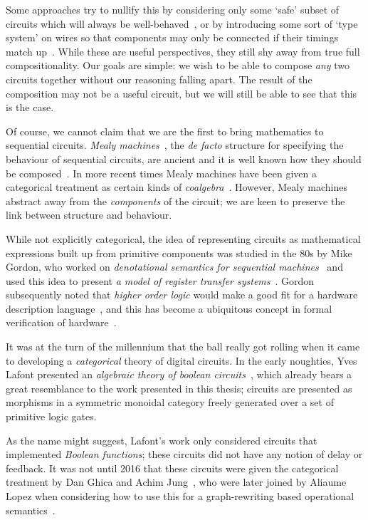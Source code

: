 Some approaches try to nullify this by considering only some `safe' subset of
circuits which will always be well-behaved~\cite{christensen2021wire}, or by
introducing some sort of `type system' on wires so that components may only be
connected if their timings match up~\cite{nigam2023modular}.
While these are useful perspectives, they still shy away from true full
compositionality.
Our goals are simple: we wish to be able to compose \emph{any} two circuits
together without our reasoning falling apart.
The result of the composition may not be a useful circuit, but we will still
be able to see that this is the case.

Of course, we cannot claim that we are the first to bring mathematics to
sequential circuits.
\emph{Mealy machines}~\cite{mealy1955method}, the \emph{de facto} structure for
specifying the behaviour of sequential circuits, are ancient and it is well
known how they should be composed~\cite{ginzburg2014algebraic}.
In more recent times Mealy machines have been given a categorical treatment as
certain kinds of \emph{coalgebra}~\cite{rutten2006algebraic,bonsangue2008coalgebraic}.
However, Mealy machines abstract away from the \emph{components} of the circuit;
we are keen to preserve the link between structure and behaviour.

While not explicitly categorical, the idea of representing circuits as
mathematical expressions built up from primitive components was studied in the
80s by Mike Gordon, who worked on
\emph{denotational semantics for sequential machines}~\cite{gordon1980denotational}
and used this idea to present
\emph{a model of register transfer systems}~\cite{gordon1982model}.
Gordon subsequently noted that \emph{higher order logic} would make a good fit
for a hardware description language~\cite{gordon1985why}, and this has become
a ubiquitous concept in formal verification of hardware~\cite{gupta1992formal}.

It was at the turn of the millennium that the ball really got rolling when it
came to developing a \emph{categorical} theory of digital circuits.
In the early noughties, Yves Lafont presented an
\emph{algebraic theory of boolean circuits}~\cite{lafont2003algebraic}, which
already bears a great resemblance to the work presented in this thesis; circuits
are presented as morphisms in a symmetric monoidal category freely generated
over a set of primitive logic gates.

As the name might suggest, Lafont's work only considered circuits that
implemented \emph{Boolean functions}; these circuits did not have any notion of
delay or feedback.
It was not until 2016 that these circuits were given the categorical treatment
by Dan Ghica and Achim Jung~\cite{ghica2016categorical}, who were later joined
by Aliaume Lopez when considering how to use this for a graph-rewriting based
operational semantics~\cite{ghica2017diagrammatic}.

